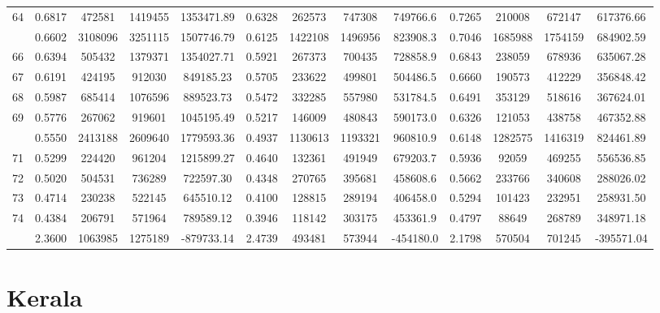 \documentclass[
  12pt,
]{article}
\begin{document}
\begin{longtable}[t]{lcccccccccccc}
64 & 0.6817 & 472581 & 1419455 & 1353471.89 & 0.6328 & 262573 & 747308 & 749766.6 & 0.7265 & 210008 & 672147 & 617376.66\\
\addlinespace
65 & 0.6602 & 3108096 & 3251115 & 1507746.79 & 0.6125 & 1422108 & 1496956 & 823908.3 & 0.7046 & 1685988 & 1754159 & 684902.59\\
66 & 0.6394 & 505432 & 1379371 & 1354027.71 & 0.5921 & 267373 & 700435 & 728858.9 & 0.6843 & 238059 & 678936 & 635067.28\\
67 & 0.6191 & 424195 & 912030 & 849185.23 & 0.5705 & 233622 & 499801 & 504486.5 & 0.6660 & 190573 & 412229 & 356848.42\\
68 & 0.5987 & 685414 & 1076596 & 889523.73 & 0.5472 & 332285 & 557980 & 531784.5 & 0.6491 & 353129 & 518616 & 367624.01\\
69 & 0.5776 & 267062 & 919601 & 1045195.49 & 0.5217 & 146009 & 480843 & 590173.0 & 0.6326 & 121053 & 438758 & 467352.88\\
\addlinespace
70 & 0.5550 & 2413188 & 2609640 & 1779593.36 & 0.4937 & 1130613 & 1193321 & 960810.9 & 0.6148 & 1282575 & 1416319 & 824461.89\\
71 & 0.5299 & 224420 & 961204 & 1215899.27 & 0.4640 & 132361 & 491949 & 679203.7 & 0.5936 & 92059 & 469255 & 556536.85\\
72 & 0.5020 & 504531 & 736289 & 722597.30 & 0.4348 & 270765 & 395681 & 458608.6 & 0.5662 & 233766 & 340608 & 288026.02\\
73 & 0.4714 & 230238 & 522145 & 645510.12 & 0.4100 & 128815 & 289194 & 406458.0 & 0.5294 & 101423 & 232951 & 258931.50\\
74 & 0.4384 & 206791 & 571964 & 789589.12 & 0.3946 & 118142 & 303175 & 453361.9 & 0.4797 & 88649 & 268789 & 348971.18\\
\addlinespace
75 & 2.3600 & 1063985 & 1275189 & -879733.14 & 2.4739 & 493481 & 573944 & -454180.0 & 2.1798 & 570504 & 701245 & -395571.04\\*
\end{longtable}
\endgroup{}

\pagebreak

\hypertarget{kerala}{%
\section{Kerala}\label{kerala}}

\begingroup\fontsize{9.7}{11.7}\selectfont
\end{document}
